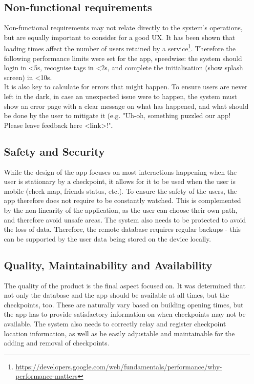 \documentclass[10pt,twocolumn]{article} %
\begin{document}
\subsection*{Non-functional requirements}
Non-functional requirements may not relate directly to the system's operations, but are equally important to consider for a good UX. It has been shown that loading times affect the number of users retained by a service\footnote{\url{https://developers.google.com/web/fundamentals/performance/why-performance-matters}}. Therefore the following performance limits were set for the app, speedwise: the system should login in \textless5s, recognise tags in \textless2s, and complete the initialisation (show splash screen) in \textless10s.\\
It is also key to calculate for errors that might happen. To ensure users are never left in the dark, in case an unexpected issue were to happen, the system must show an error page with a clear message on what has happened, and what should be done by the user to mitigate it (e.g. "Uh-oh, something puzzled our app! Please leave feedback here \textless link\textgreater!".
\subsection*{Safety and Security}
While the design of the app focuses on most interactions happening when the user is stationary by a checkpoint, it allows for it to be used when the user is mobile (check map, friends status, etc.). To ensure the safety of the users, the app therefore does not require to be constantly watched. This is complemented by the non-linearity of the application, as the user can choose their own path, and therefore avoid unsafe areas. The system also needs to be protected to avoid the loss of data. Therefore, the remote database requires regular backups - this can be supported by the user data being stored on the device locally.
\subsection*{Quality, Maintainability and Availability}
The quality of the product is the final aspect focused on. It was determined that not only the database and the app should be available at all times, but the checkpoints, too. These are naturally vary based on building opening times, but the app has to provide satisfactory information on when checkpoints may not be available. The system also needs to correctly relay and register checkpoint location information, as well as be easily adjustable and maintainable for the adding and removal of checkpoints. 
\end{document}
